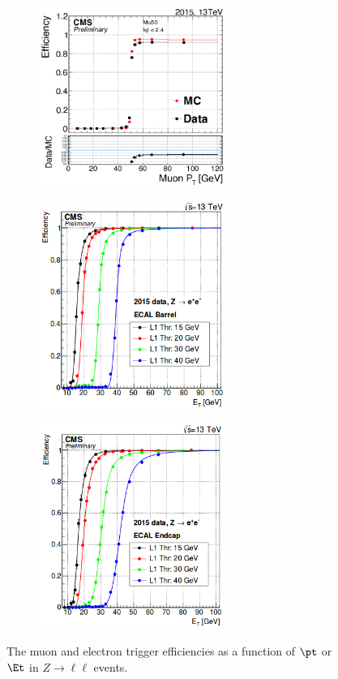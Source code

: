 \begin{figure}
	\centering
	\begin{subfigure}[t]{2.4in}
		\centering
		\includegraphics[width=2.4in]{figures/muonPt50TrgEffVsPt.png}
	\end{subfigure}
	\newline
	\newline
	\newline
	\newline
	\begin{subfigure}[t]{2.4in}
		\centering
		\includegraphics[width=2.4in]{figures/L1EGEfficiencyBarrel.png}
	\end{subfigure}
	\thickspace
	\begin{subfigure}[t]{2.4in}
		\centering
		\includegraphics[width=2.4in]{figures/L1EGEfficiencyEndcap.png}
	\end{subfigure}
	\caption{The muon and electron trigger efficiencies as a function of $\pt$ or $\Et$ in $Z \rightarrow \ell\ell$ events.}\label{fig:trigEffs}
\end{figure}
\clearpage

